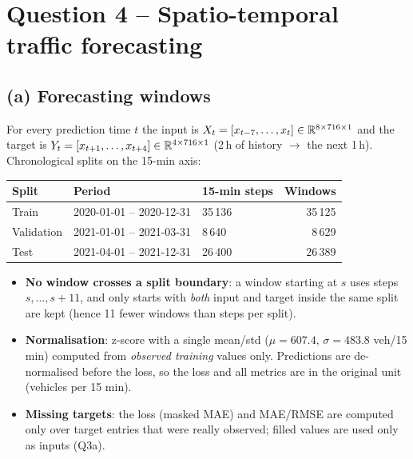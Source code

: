 \section*{Question 4 -- Spatio-temporal traffic forecasting}

\subsection*{(a) Forecasting windows}
For every prediction time $t$ the input is $X_t=[x_{t-7},\dots,x_t]\in\mathbb{R}^{8\times716\times1}$ and the target is
$Y_t=[x_{t+1},\dots,x_{t+4}]\in\mathbb{R}^{4\times716\times1}$ (2\,h of history $\to$ the next 1\,h). Chronological splits on
the 15-min axis:
\begin{center}
\begin{tabular}{lll r}\toprule
Split & Period & 15-min steps & Windows\\\midrule
Train & 2020-01-01 -- 2020-12-31 & 35\,136 & 35\,125\\
Validation & 2021-01-01 -- 2021-03-31 & 8\,640 & 8\,629\\
Test & 2021-04-01 -- 2021-12-31 & 26\,400 & 26\,389\\\bottomrule
\end{tabular}
\end{center}
\begin{itemize}
\item \textbf{No window crosses a split boundary}: a window starting at $s$ uses steps $s,\dots,s+11$, and only
starts with \emph{both} input and target inside the same split are kept (hence 11 fewer windows than steps per split).
\item \textbf{Normalisation}: z-score with a single mean/std ($\mu=607.4$, $\sigma=483.8$ veh/15\,min) computed from
\emph{observed training} values only. Predictions are de-normalised before the loss, so the loss and all metrics are in
the original unit (vehicles per 15 min).
\item \textbf{Missing targets}: the loss (masked MAE) and MAE/RMSE are computed only over target entries that were
really observed; filled values are used only as inputs (Q3a).
\end{itemize}

